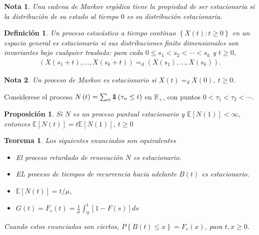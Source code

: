 \documentclass{article}
\newtheorem{Def}{Definición}
\newtheorem{Teo}{Teorema}
\newtheorem{Note}{Nota}
\newtheorem{Prop}{Proposición}
\newcommand{\rea}{\mathbb{R}}
\newcommand{\esp}{\mathbb{E}}
\newcommand{\indora}{\mbox{$1$\hspace{-0.8ex}$1$}}
\begin{document}
\begin{Note}
Una cadena de Markov erg\'odica tiene la propiedad de ser estacionaria si la distribuci\'on de su estado al tiempo $0$ es su distribuci\'on estacionaria.
\end{Note}


\begin{Def}
Un proceso estoc\'astico a tiempo continuo $\left\{X\left(t\right):t\geq0\right\}$ en un espacio general es estacionario si sus distribuciones finito dimensionales son invariantes bajo cualquier  traslado: para cada $0\leq s_{1}<s_{2}<\cdots<s_{k}$ y $t\geq0$,
\begin{eqnarray*}
\left(X\left(s_{1}+t\right),\ldots,X\left(s_{k}+t\right)\right)=_{d}\left(X\left(s_{1}\right),\ldots,X\left(s_{k}\right)\right).
\end{eqnarray*}
\end{Def}

\begin{Note}
Un proceso de Markov es estacionario si $X\left(t\right)=_{d}X\left(0\right)$, $t\geq0$.
\end{Note}

Considerese el proceso $N\left(t\right)=\sum_{n}\indora\left(\tau_{n}\leq t\right)$ en $\rea_{+}$, con puntos $0<\tau_{1}<\tau_{2}<\cdots$.

\begin{Prop}
Si $N$ es un proceso puntual estacionario y $\esp\left[N\left(1\right)\right]<\infty$, entonces $\esp\left[N\left(t\right)\right]=t\esp\left[N\left(1\right)\right]$, $t\geq0$

\end{Prop}

\begin{Teo}
Los siguientes enunciados son equivalentes
\begin{itemize}
\item[i)] El proceso retardado de renovaci\'on $N$ es estacionario.

\item[ii)] EL proceso de tiempos de recurrencia hacia adelante $B\left(t\right)$ es estacionario.


\item[iii)] $\esp\left[N\left(t\right)\right]=t/\mu$,


\item[iv)] $G\left(t\right)=F_{e}\left(t\right)=\frac{1}{\mu}\int_{0}^{t}\left[1-F\left(s\right)\right]ds$
\end{itemize}
Cuando estos enunciados son ciertos, $P\left\{B\left(t\right)\leq x\right\}=F_{e}\left(x\right)$, para $t,x\geq0$.

\end{Teo}
\end{document}
